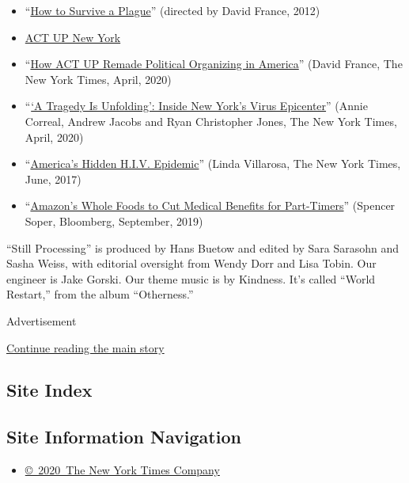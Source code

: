 \begin{itemize}
\item
  ``\href{https://www.imdb.com/title/tt2124803/}{How to Survive a
  Plague}'' (directed by David France, 2012)
\item
  \href{https://actupny.org/}{ACT UP New York}
\item
  ``\href{https://www.nytimes.com/interactive/2020/04/13/t-magazine/act-up-aids.html}{How
  ACT UP Remade Political Organizing in America}'' (David France, The
  New York Times, April, 2020)
\item
  ``\href{https://www.nytimes.com/2020/04/09/nyregion/coronavirus-queens-corona-jackson-heights-elmhurst.html}{`A
  Tragedy Is Unfolding': Inside New York's Virus Epicenter}'' (Annie
  Correal, Andrew Jacobs and Ryan Christopher Jones, The New York Times,
  April, 2020)
\item
  ``\href{https://www.nytimes.com/2017/06/06/magazine/americas-hidden-hiv-epidemic.html}{America's
  Hidden H.I.V. Epidemic}'' (Linda Villarosa, The New York Times, June,
  2017)
\item
  ``\href{https://www.bloomberg.com/news/articles/2019-09-12/amazon-s-whole-foods-to-cut-benefits-for-part-timers-report}{Amazon's
  Whole Foods to Cut Medical Benefits for Part-Timers}'' (Spencer Soper,
  Bloomberg, September, 2019)
\end{itemize}

``Still Processing'' is produced by Hans Buetow and edited by Sara
Sarasohn and Sasha Weiss, with editorial oversight from Wendy Dorr and
Lisa Tobin. Our engineer is Jake Gorski. Our theme music is by Kindness.
It's called ``World Restart,'' from the album ``Otherness.''

Advertisement

\protect\hyperlink{after-bottom}{Continue reading the main story}

\hypertarget{site-index}{%
\subsection{Site Index}\label{site-index}}

\hypertarget{site-information-navigation}{%
\subsection{Site Information
Navigation}\label{site-information-navigation}}

\begin{itemize}
\tightlist
\item
  \href{https://help.nytimes.com/hc/en-us/articles/115014792127-Copyright-notice}{©~2020~The
  New York Times Company}
\end{itemize}

